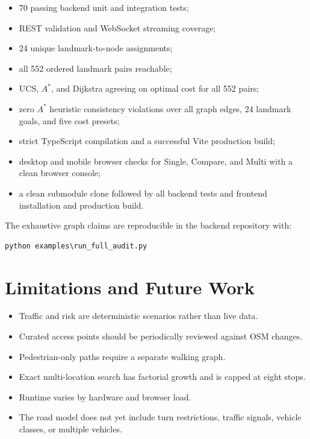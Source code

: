 \documentclass[12pt,a4paper]{article}
\begin{document}
\begin{itemize}
    \item 70 passing backend unit and integration tests;
    \item REST validation and WebSocket streaming coverage;
    \item 24 unique landmark-to-node assignments;
    \item all 552 ordered landmark pairs reachable;
    \item UCS, $A^*$, and Dijkstra agreeing on optimal cost for all 552 pairs;
    \item zero $A^*$ heuristic consistency violations over all graph edges, 24
          landmark goals, and five cost presets;
    \item strict TypeScript compilation and a successful Vite production build;
    \item desktop and mobile browser checks for Single, Compare, and Multi with
          a clean browser console;
    \item a clean submodule clone followed by all backend tests and frontend
          installation and production build.
\end{itemize}

The exhaustive graph claims are reproducible in the backend repository with:

\begin{lstlisting}
python examples\run_full_audit.py
\end{lstlisting}

\section{Limitations and Future Work}

\begin{itemize}
    \item Traffic and risk are deterministic scenarios rather than live data.
    \item Curated access points should be periodically reviewed against OSM changes.
    \item Pedestrian-only paths require a separate walking graph.
    \item Exact multi-location search has factorial growth and is capped at
          eight stops.
    \item Runtime varies by hardware and browser load.
    \item The road model does not yet include turn restrictions, traffic
          signals, vehicle classes, or multiple vehicles.
\end{itemize}
\end{document}
